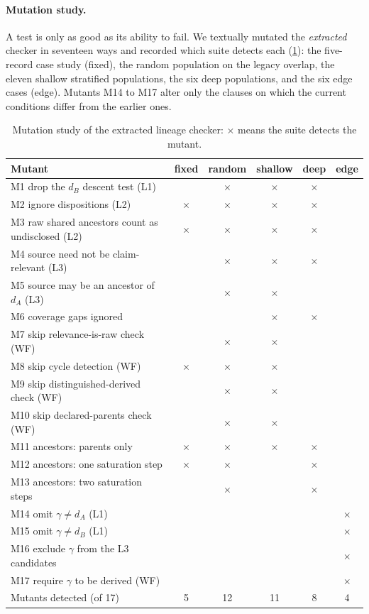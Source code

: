 \paragraph{Mutation study.}
A test is only as good as its ability to fail. We textually mutated the \emph{extracted} checker in seventeen ways and recorded which suite detects each (\cref{tab:mutants}): the five-record case study (fixed), the random population on the legacy overlap, the eleven shallow stratified populations, the six deep populations, and the six edge cases (edge). Mutants M14 to M17 alter only the clauses on which the current conditions differ from the earlier ones.
\begin{table}[t]
\centering\small
\caption{Mutation study of the extracted lineage checker: $\times$ means the suite detects the mutant.}\label{tab:mutants}
\begin{tabular}{@{}lccccc@{}}
\toprule
Mutant & fixed & random & shallow & deep & edge \\
\midrule
M1 drop the $d_B$ descent test (L1) & & $\times$ & $\times$ & $\times$ & \\
M2 ignore dispositions (L2) & $\times$ & $\times$ & $\times$ & $\times$ & \\
M3 raw shared ancestors count as undisclosed (L2) & $\times$ & $\times$ & $\times$ & $\times$ & \\
M4 source need not be claim-relevant (L3) & & $\times$ & $\times$ & $\times$ & \\
M5 source may be an ancestor of $d_A$ (L3) & & $\times$ & $\times$ & & \\
M6 coverage gaps ignored & & & $\times$ & $\times$ & \\
M7 skip relevance-is-raw check (WF) & & $\times$ & $\times$ & & \\
M8 skip cycle detection (WF) & $\times$ & $\times$ & $\times$ & & \\
M9 skip distinguished-derived check (WF) & & $\times$ & $\times$ & & \\
M10 skip declared-parents check (WF) & & $\times$ & $\times$ & & \\
M11 ancestors: parents only & $\times$ & $\times$ & $\times$ & $\times$ & \\
M12 ancestors: one saturation step & $\times$ & $\times$ & & $\times$ & \\
M13 ancestors: two saturation steps & & $\times$ & & $\times$ & \\
M14 omit $\gamma \neq d_A$ (L1) & & & & & $\times$ \\
M15 omit $\gamma \neq d_B$ (L1) & & & & & $\times$ \\
M16 exclude $\gamma$ from the L3 candidates & & & & & $\times$ \\
M17 require $\gamma$ to be derived (WF) & & & & & $\times$ \\
\midrule
Mutants detected (of 17) & 5 & 12 & 11 & 8 & 4 \\
\bottomrule
\end{tabular}
\end{table}
